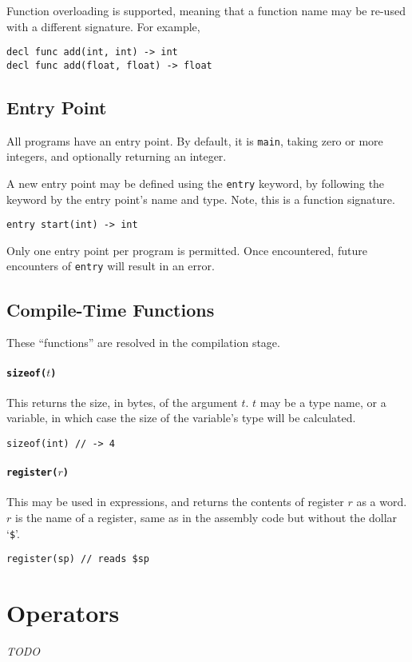 \documentclass{article}
\begin{document}
Function overloading is supported, meaning that a function name may be re-used with a different signature.
For example,

\begin{lstlisting}[language=CustomLang]
decl func add(int, int) -> int
decl func add(float, float) -> float
\end{lstlisting}

\subsection{Entry Point}

All programs have an entry point.
By default, it is \texttt{main}, taking zero or more integers, and optionally returning an integer.

A new entry point may be defined using the \texttt{entry} keyword, by following the keyword by the entry point's name and type.
Note, this is a function signature.

\begin{lstlisting}[language=CustomLang]
entry start(int) -> int
\end{lstlisting}

Only one entry point per program is permitted.
Once encountered, future encounters of \texttt{entry} will result in an error.

\subsection{Compile-Time Functions}

These ``functions'' are resolved in the compilation stage.

\paragraph*{\texttt{sizeof(\(t\))}}
This returns the size, in bytes, of the argument \(t\).
\(t\) may be a type name, or a variable, in which case the size of the variable's type will be calculated.

\begin{lstlisting}[language=CustomLang]
sizeof(int) // -> 4
\end{lstlisting}

\paragraph*{\texttt{register(\(r\))}}
This may be used in expressions, and returns the contents of register \(r\) as a word.
\(r\) is the name of a register, same as in the assembly code but without the dollar `\texttt{\$}'.

\begin{lstlisting}[language=CustomLang]
register(sp) // reads $sp
\end{lstlisting}

\section{Operators}

\textit{TODO}
\end{document}
